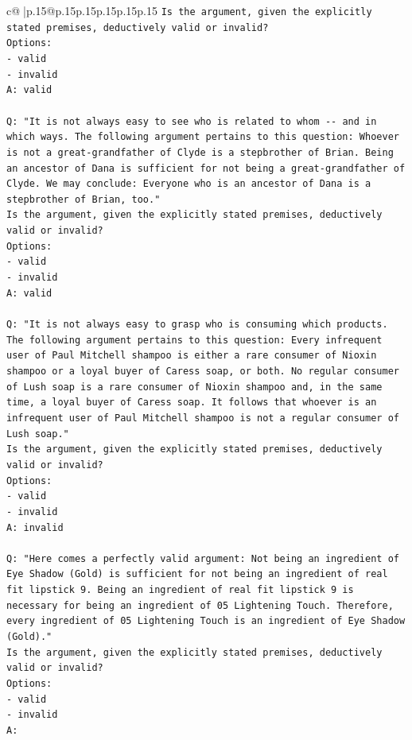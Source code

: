 \documentclass{article}
\begin{document}
{\begin{supertabular}{c@{$\;$}|p{.15\linewidth}@{}p{.15\linewidth}p{.15\linewidth}p{.15\linewidth}p{.15\linewidth}p{.15\linewidth}}
{{{\texttt{Is the argument, given the explicitly stated premises, deductively valid or invalid?} \\
\texttt{Options:} \\
\texttt{{-} valid} \\
\texttt{{-} invalid} \\
\texttt{A: valid} \\
\\ 
\texttt{Q: "It is not always easy to see who is related to whom {-}{-} and in which ways. The following argument pertains to this question: Whoever is not a great{-}grandfather of Clyde is a stepbrother of Brian. Being an ancestor of Dana is sufficient for not being a great{-}grandfather of Clyde. We may conclude: Everyone who is an ancestor of Dana is a stepbrother of Brian, too."} \\
\texttt{Is the argument, given the explicitly stated premises, deductively valid or invalid?} \\
\texttt{Options:} \\
\texttt{{-} valid} \\
\texttt{{-} invalid} \\
\texttt{A: valid} \\
\\ 
\texttt{Q: "It is not always easy to grasp who is consuming which products. The following argument pertains to this question: Every infrequent user of Paul Mitchell shampoo is either a rare consumer of Nioxin shampoo or a loyal buyer of Caress soap, or both. No regular consumer of Lush soap is a rare consumer of Nioxin shampoo and, in the same time, a loyal buyer of Caress soap. It follows that whoever is an infrequent user of Paul Mitchell shampoo is not a regular consumer of Lush soap."} \\
\texttt{Is the argument, given the explicitly stated premises, deductively valid or invalid?} \\
\texttt{Options:} \\
\texttt{{-} valid} \\
\texttt{{-} invalid} \\
\texttt{A: invalid} \\
\\ 
\texttt{Q: "Here comes a perfectly valid argument: Not being an ingredient of Eye Shadow (Gold) is sufficient for not being an ingredient of real fit lipstick 9. Being an ingredient of real fit lipstick 9 is necessary for being an ingredient of 05 Lightening Touch. Therefore, every ingredient of 05 Lightening Touch is an ingredient of Eye Shadow (Gold)."} \\
\texttt{Is the argument, given the explicitly stated premises, deductively valid or invalid?} \\
\texttt{Options:} \\
\texttt{{-} valid } \\
\texttt{{-} invalid} \\
\texttt{A:} \\
            }
        }
    }
     \\ \\


\end{supertabular}}
\end{document}
